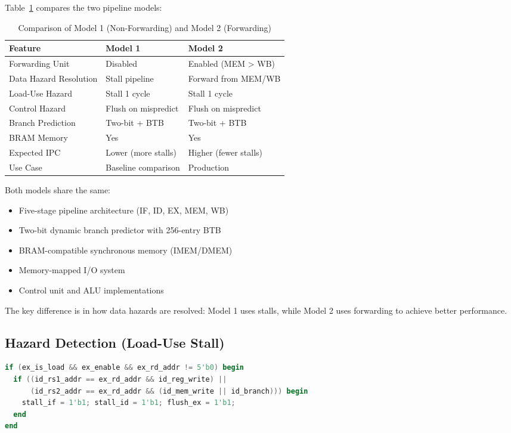 Table~\ref{tab:model_comparison} compares the two pipeline models:

\begin{table}[ht]
\centering
\caption{Comparison of Model 1 (Non-Forwarding) and Model 2 (Forwarding)}
\label{tab:model_comparison}
\begin{tabular}{lll}
\toprule
\textbf{Feature} & \textbf{Model 1} & \textbf{Model 2} \\
\midrule
Forwarding Unit & Disabled & Enabled (MEM > WB) \\
Data Hazard Resolution & Stall pipeline & Forward from MEM/WB \\
Load-Use Hazard & Stall 1 cycle & Stall 1 cycle \\
Control Hazard & Flush on mispredict & Flush on mispredict \\
Branch Prediction & Two-bit + BTB & Two-bit + BTB \\
BRAM Memory & Yes & Yes \\
Expected IPC & Lower (more stalls) & Higher (fewer stalls) \\
Use Case & Baseline comparison & Production \\
\bottomrule
\end{tabular}
\end{table}

Both models share the same:
\begin{itemize}
    \item Five-stage pipeline architecture (IF, ID, EX, MEM, WB)
    \item Two-bit dynamic branch predictor with 256-entry BTB
    \item BRAM-compatible synchronous memory (IMEM/DMEM)
    \item Memory-mapped I/O system
    \item Control unit and ALU implementations
\end{itemize}

The key difference is in how data hazards are resolved: Model 1 uses stalls, while Model 2 uses forwarding to achieve better performance.

\subsection{Hazard Detection (Load-Use Stall)}
\begin{lstlisting}[language=Verilog, caption=Load-use stall insertion]
if (ex_is_load && ex_enable && ex_rd_addr != 5'b0) begin
  if ((id_rs1_addr == ex_rd_addr && id_reg_write) ||
      (id_rs2_addr == ex_rd_addr && (id_mem_write || id_branch))) begin
    stall_if = 1'b1; stall_id = 1'b1; flush_ex = 1'b1;
  end
end
\end{lstlisting}

